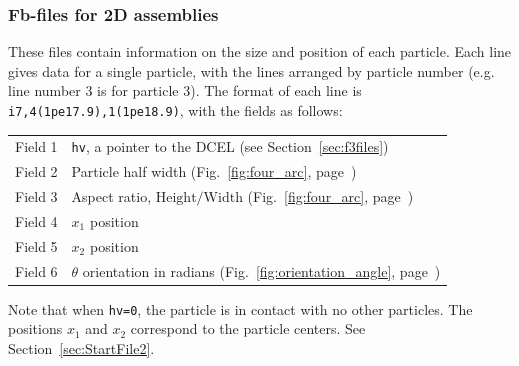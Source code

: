 \documentclass[letterpaper,11pt]{article}
\begin{document}
\subsubsection{Fb-files for 2D assemblies}\label{sec:f2files}
These files contain information on the size and position of each particle.
Each line gives data for a single particle, with the
lines arranged by particle number (e.g. line number 3 is for particle
3).
The format of each line is \texttt{i7,4(1pe17.9),1(1pe18.9)}, 
with the fields as follows:
\begin{center}
\begin{tabular}{lp{3.5in}}
Field 1 & \texttt{hv}, a pointer to the DCEL 
(see Section~\ref{sec:f3files}) \\
Field 2 & Particle half width (Fig.~\ref{fig:four_arc}, 
page~\pageref{fig:four_arc})\\
Field 3 & Aspect ratio, $\mathrm{Height}/\mathrm{Width}$ 
(Fig.~\ref{fig:four_arc}, page~\pageref{fig:four_arc})\\
Field 4 & $x_{1}$ position \\
Field 5 & $x_{2}$ position \\
Field 6 & $\theta$ orientation in radians 
(Fig.~\ref{fig:orientation_angle}, 
page~\pageref{fig:orientation_angle})
\end{tabular}
\end{center}
Note that when \texttt{hv=0}, the particle is in contact with no other
particles.
The positions $x_{1}$ and $x_{2}$ correspond to the particle centers.
See Section~\ref{sec:StartFile2}.
%
\end{document}
